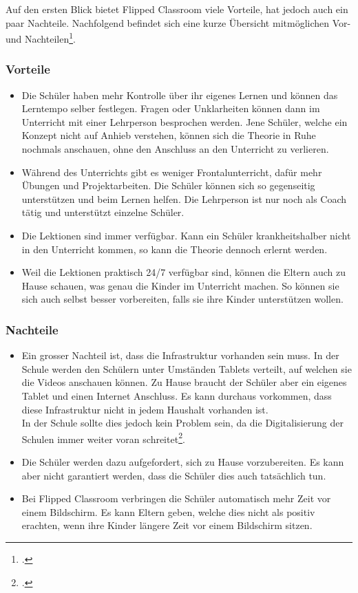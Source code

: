 \newpage

Auf den ersten Blick bietet Flipped Classroom viele Vorteile, hat jedoch auch ein paar Nachteile. Nachfolgend befindet sich eine kurze Übersicht mitmöglichen Vor- und Nachteilen\footcite{flipped_classroom_pro_con}.

\subsubsection*{Vorteile}
\begin{itemize}
	\item Die Schüler haben mehr Kontrolle über ihr eigenes Lernen und können das Lerntempo selber festlegen. Fragen oder Unklarheiten können dann im Unterricht mit einer Lehrperson besprochen werden. Jene Schüler, welche ein Konzept nicht auf Anhieb verstehen, können sich die Theorie in Ruhe nochmals anschauen, ohne den Anschluss an den Unterricht zu verlieren.
	\item Während des Unterrichts gibt es weniger Frontalunterricht, dafür mehr Übungen und Projektarbeiten. Die Schüler können sich so gegenseitig unterstützen und beim Lernen helfen. Die Lehrperson ist nur noch als Coach tätig und unterstützt einzelne Schüler.
	\item Die Lektionen sind immer verfügbar. Kann ein Schüler krankheitshalber nicht in den Unterricht kommen, so kann die Theorie dennoch erlernt werden. 
	\item Weil die Lektionen praktisch 24/7 verfügbar sind, können die Eltern auch zu Hause schauen, was genau die Kinder im Unterricht machen. So können sie sich auch selbst besser vorbereiten, falls sie ihre Kinder unterstützen wollen. 
\end{itemize}

\subsubsection*{Nachteile}
\begin{itemize}
	\item Ein grosser Nachteil ist, dass die Infrastruktur vorhanden sein muss. In der Schule werden den Schülern unter Umständen Tablets verteilt, auf welchen sie die Videos anschauen können. Zu Hause braucht der Schüler aber ein eigenes Tablet und einen Internet Anschluss. Es kann durchaus vorkommen, dass diese Infrastruktur nicht in jedem Haushalt vorhanden ist. \\
	In der Schule sollte dies jedoch kein Problem sein, da die Digitalisierung der Schulen immer weiter voran schreitet\footcite{digitale_schule}.
	\item Die Schüler werden dazu aufgefordert, sich zu Hause vorzubereiten. Es kann aber nicht garantiert werden, dass die Schüler dies auch tatsächlich tun.
	\item Bei Flipped Classroom verbringen die Schüler automatisch mehr Zeit vor einem Bildschirm. Es kann Eltern geben, welche dies nicht als positiv erachten, wenn ihre Kinder längere Zeit vor einem Bildschirm sitzen.
\end{itemize}

